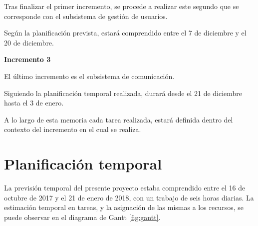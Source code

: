 Tras finalizar el primer incremento, se procede a realizar este segundo que se corresponde con el subsistema de gestión de usuarios.


Según la planificación prevista, estará comprendido entre el 7 de diciembre y el 20 de diciembre.\newline


\textbf{Incremento 3}\newline


El último incremento es el subsistema de comunicación. 


Siguiendo la planificación temporal realizada, durará desde el 21 de diciembre hasta el 3 de enero.


A lo largo de esta memoria cada tarea realizada, estará definida dentro del contexto del incremento en el cual se realiza.


\section{Planificación temporal}
La previsión temporal del presente proyecto estaba comprendido entre el 16 de octubre de 2017 y el 21 de enero de 2018, con un trabajo de seis horas diarias. La estimación temporal en tareas, y la asignación de las mismas a los recursos, se puede observar en el diagrama de Gantt \ref{fig:gantt}.

